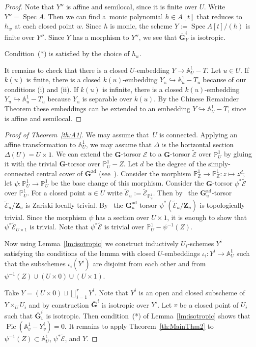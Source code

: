 \documentclass[11pt]{amsart}
\newcommand\A{\mathbb A}
\renewcommand\P{\mathbb P}
\DeclareMathOperator\Pic{{Pic}}
\DeclareMathOperator\Spec{{Spec}}
\DeclareMathOperator{\ad}{ad}
\theoremstyle{plain}
\theoremstyle{definition}
\theoremstyle{remark}
\newcommand\cE{{\mathcal{E}}}
\newcommand\bG{{\mathbf G}}
\newcommand\bZ{{\mathbf Z}}
\newcommand\Z{\mathbb Z}
\begin{document}
\begin{proof}
Note that $Y''$ is affine and semilocal, since it is finite over $U$. Write $Y''=\Spec A$. Then we can find a~monic polynomial $h\in A[t]$ that reduces to $h_w$ at each closed point $w$. Since $h$ is monic, the scheme $Y:=\Spec A[t]/(h)$ is finite over $Y''$. Since $Y$ has a morphism to $Y''$, we see that $\overline{\bG}^i_Y$ is isotropic.

Condition~(*) is satisfied by the choice of $h_w$.

It remains to check that there is a closed $U$-embedding $Y\to\A^1_U-T$. Let $u\in U$. If $k(u)$ is finite, there is a closed $k(u)$-embedding $Y_u\hookrightarrow\A^1_u-T_u$ because of our conditions (i) and (ii). If $k(u)$ is infinite, there is a closed $k(u)$-embedding $Y_u\hookrightarrow\A^1_u-T_u$ because $Y_u$ is separable over $k(u)$. By the Chinese Remainder Theorem these embeddings can be extended to an embedding $Y\hookrightarrow\A^1_U-T$, since is affine and semilocal.
\end{proof}

\begin{proof}[Proof of Theorem~\ref{th:A1}]
We may assume that~$U$ is connected. Applying an affine transformation to $\A^1_U$, we may assume that $\Delta$ is the horizontal section $\Delta(U)=U\times1$. We can extend the $\bG$-torsor $\cE$ to a $\bG$-torsor $\widetilde\cE$ over $\P^1_U$ by gluing it with the trivial $\bG$-torsor over $\P^1_U-Z$. Let $d$ be the degree of the simply-connected central cover of $\bG^{\ad}$ (see~\cite[Exercise~6.5.2]{ConradReductive}). Consider the morphism $\P^1_\Z\to\P^1_\Z\colon z\mapsto z^d$; let $\psi\colon\P^1_U\to\P^1_U$ be the base change of this morphism. Consider the $\bG$-torsor $\psi^*\widetilde\cE$ over $\P^1_U$. For a closed point $u\in U$ write $\widetilde\cE_u:=\widetilde\cE_{\P_u^1}$. Then by~\cite[thm.~3.8(a)]{GilleTorseurs} the $\bG^{\ad}_u$-torsor $\widetilde\cE_u/\bZ_u$ is Zariski locally trivial. By~\cite[Prop.~2.3]{FedorovGrSerreNonSC} the $\bG^{\ad}_u$-torsor $\psi^*(\widetilde\cE_u/\bZ_u)$ is topologically trivial. Since the morphism $\psi$ has a section over $U\times1$, it is enough to show that $\psi^*\widetilde\cE_{U\times1}$ is trivial. Note that $\psi^*\widetilde\cE$ is trivial over $\P^1_U-\psi^{-1}(Z)$.

Now using Lemma~\ref{lm:isotropic} we construct inductively $U_i$-schemes $Y^i$ satisfying the conditions of the lemma with closed $U$-embeddings $\iota_i\colon Y^i\to\A^1_U$ such that the subschemes $\iota_i(Y^i)$ are disjoint from each other and from $\psi^{-1}(Z)\cup(U\times0)\cup(U\times 1)$.

Take $Y=(U\times 0)\sqcup\bigsqcup_{i=1}^rY^i$. Note that $Y^i$ is an open and closed subscheme of $Y\times_UU_i$ and by construction $\overline\bG^i$ is isotropic over $Y^i$. Let $v$ be a closed point of $U_i$ such that $\overline\bG^i_v$ is isotropic. Then condition~(*) of Lemma~\ref{lm:isotropic} shows that $\Pic(\A^1_v-Y^i_v)=0$. It remains to apply Theorem~\ref{th:MainThm2} to $\psi^{-1}(Z)\subset\A^1_U$, $\psi^*\widetilde\cE$, and $Y$.
\end{proof}
\end{document}

